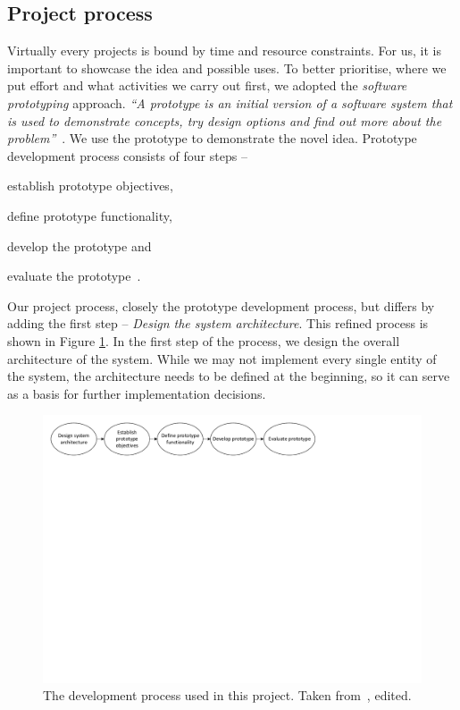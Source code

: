 \subsection{Project process}

Virtually every projects is bound by time and resource constraints. For us, it is important to showcase the idea and possible uses. To better prioritise, where we put effort and what activities we carry out first, we adopted the \textit{software prototyping} approach. \textit{``A prototype is an initial version of a software system that is used to demonstrate concepts, try design options and find out more about the problem''}~\cite{Sommerville2011SoftwareEngineering}. We use the prototype to demonstrate the novel idea. Prototype development process consists of four steps -- 
\begin{enumerate*}[label=(\roman*)]
    \item establish prototype objectives,
    \item define prototype functionality,
    \item develop the prototype and
    \item evaluate the prototype~\cite{Sommerville2011SoftwareEngineering}.
\end{enumerate*}

Our project process, closely the prototype development process, but differs by adding the first step -- \textit{Design the system architecture}. This refined process is shown in Figure \ref{fig:prototype-process}. In the first step of the process, we design the overall architecture of the system. While we may not implement every single entity of the system, the architecture needs to be defined at the beginning, so it can serve as a basis for further implementation decisions.

\begin{figure}
    \centering
    \includegraphics[width=\textwidth]{prototype-process-m}
    \caption{The development process used in this project. Taken from~\cite[p. 45]{Sommerville2011SoftwareEngineering}, edited.}
    \label{fig:prototype-process}
\end{figure}

